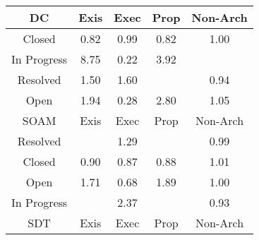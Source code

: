 \begin{tabular}{|c||c|c|c|c|}
\hline
\hline
DC & Exis & Exec & Prop & Non-Arch \\ 
\hline
Closed & \cellcolor[rgb]{0.8743978477621911,0.6714831460743711,0.38677132457804503} 0.82 & \cellcolor[rgb]{0.9083512632235959,0.8321959792583539,0.41846117900868945} 0.99 & \cellcolor[rgb]{0.8744204450832699,0.6715901067274777,0.3867924154110519} 0.82 & \cellcolor[rgb]{0.9098842327607713,0.8399451628866811,0.42} 1.00 \\ 
\hline
In Progress & \cellcolor[rgb]{0.53,0.66,0.42} 8.75 & \cellcolor[rgb]{0.76,0.13,0.28} 0.22 & \cellcolor[rgb]{0.7665796711038045,0.772064054733381,0.41999999999999993} 3.92 &  \\ 
\hline
Resolved & \cellcolor[rgb]{0.885349485164549,0.8283234403411022,0.42} 1.50 & \cellcolor[rgb]{0.8804696934471332,0.8260119600539052,0.42} 1.60 &  & \cellcolor[rgb]{0.8991128948627877,0.7884677023505284,0.40983870187193516} 0.94 \\ 
\hline
Open & \cellcolor[rgb]{0.8636983725841065,0.8180676501714188,0.42} 1.94 & \cellcolor[rgb]{0.770655571690267,0.18043637266726398,0.28994520024424925} 0.28 & \cellcolor[rgb]{0.8218581676372356,0.798248605722901,0.42} 2.80 & \cellcolor[rgb]{0.9074366095060893,0.8387857623976213,0.42} 1.05 \\ 
\hline
\hline
SOAM & Exis & Exec & Prop & Non-Arch \\ 
\hline
Resolved &  & \cellcolor[rgb]{0.8958890301659784,0.8333158563944109,0.42} 1.29 &  & \cellcolor[rgb]{0.9074956944843902,0.8281462872261137,0.41766264818543086} 0.99 \\ 
\hline
Closed & \cellcolor[rgb]{0.8910020031697031,0.7500761483365946,0.4022685362917229} 0.90 & \cellcolor[rgb]{0.8848822477875937,0.7211093061946102,0.39655676460175415} 0.87 & \cellcolor[rgb]{0.8861183425771042,0.7269601548649594,0.3977104530719638} 0.88 & \cellcolor[rgb]{0.9096526174879184,0.839835450389014,0.42} 1.01 \\ 
\hline
Open & \cellcolor[rgb]{0.8750579812884933,0.8234485174524442,0.42} 1.71 & \cellcolor[rgb]{0.8487552308430067,0.5501080926568982,0.3628382154534729} 0.68 & \cellcolor[rgb]{0.8664445276456423,0.8193684604637251,0.42} 1.89 & \cellcolor[rgb]{0.9097547954501128,0.8398838504763692,0.42} 1.00 \\ 
\hline
In Progress &  & \cellcolor[rgb]{0.8425536862872088,0.8080517461360462,0.42} 2.37 &  & \cellcolor[rgb]{0.8957512773162324,0.7725560459634997,0.4067011921618168} 0.93 \\ 
\hline
\hline
SDT & Exis & Exec & Prop & Non-Arch \\ 

\end{tabular}
